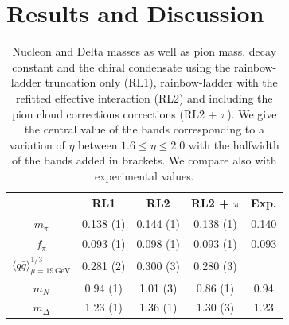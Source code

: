 \section{Results and Discussion}
\label{sec:results}

\begin{table}[t]
 \begin{center}
 \small
\renewcommand{\arraystretch}{1.2}
  \begin{tabular}[h]{|c||c|c|c|c|}\hline
  [GeV]     &  RL1     & RL2      & RL2 + $\pi$ & Exp. \\ \hline\hline
 $m_\pi$  	& 0.138 (1)& 0.144 (1)& 0.138 (1)   & 0.140\\ \hline
 $f_\pi$  	& 0.093 (1)& 0.098 (1)& 0.093 (1)   & 0.093\\ \hline
 $\langle q\bar{q}\rangle^{1/3}_{\mu=19 \,\text{GeV}}$
          	& 0.281 (2)& 0.300 (3)& 0.280 (3)    &      \\ \hline\hline
 $m_N$      & 0.94 (1) & 1.01 (3) & 0.86 (1)    & 0.94 \\ \hline
 $m_\Delta$ & 1.23 (1) & 1.36 (1) & 1.30 (3)    & 1.23 \\ \hline
\end{tabular}
\caption{Nucleon and Delta masses as well as pion mass, decay constant and the chiral condensate 
using the rainbow-ladder truncation only (RL1),
rainbow-ladder with the refitted effective interaction (RL2) and including the pion 
cloud corrections corrections (RL2 + $\pi$). 
We give the central value of the bands corresponding to a variation of 
$\eta$ between $1.6 \le \eta \le 2.0$ with the halfwidth of the bands added in brackets. 
We compare also with experimental values.\label{tab:masses}}
 \end{center}
\end{table}


